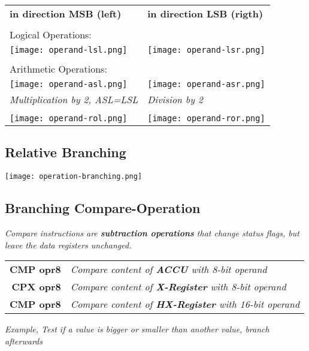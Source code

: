 \begin{tabular}{ll}
    \textbf{in direction MSB (left)} & \textbf{in direction LSB (rigth)} \\
    \\
    Logical Operations: \\
    \texttt{[image: operand-lsl.png]} &
    \texttt{[image: operand-lsr.png]} \\
    \\
    Arithmetic Operations: \\
    \texttt{[image: operand-asl.png]} &
    \texttt{[image: operand-asr.png]} \\
    \textit{Multiplication by 2, ASL=LSL} &
    \textit{Division by 2} \\
    \\
    \texttt{[image: operand-rol.png]} &
    \texttt{[image: operand-ror.png]} \\
\end{tabular}

\subsection{Relative Branching}

\texttt{[image: operation-branching.png]}

\subsection{Branching Compare-Operation}

\textit{
    Compare instructions are \textbf{subtraction operations} that change status
    flags, but leave the data registers unchanged.
}

\begin{tabular}{rp{}}
    \textbf{CMP opr8} & \textit{Compare content of \textbf{ACCU} with 8-bit operand} \\
    \textbf{CPX opr8} & \textit{Compare content of \textbf{X-Register} with 8-bit operand} \\
    \textbf{CMP opr8} & \textit{Compare content of \textbf{HX-Register} with 16-bit operand} \\
\end{tabular}

\textit{
    Example, Test if a value is bigger or smaller than
    another value, branch afterwards
}

